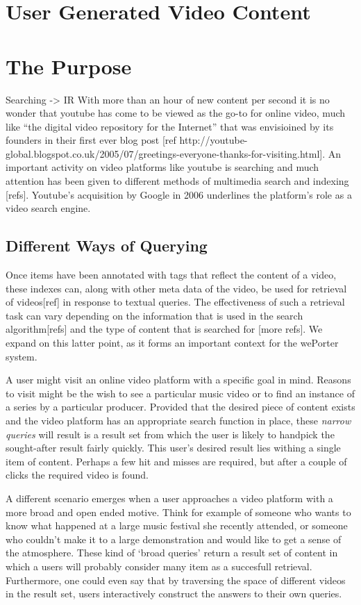 \section{User Generated Video Content}

\section{The Purpose}

Searching -> IR
With more than an hour of new content per second it is no wonder that youtube has come to be viewed as the go-to for online video, much like ``the digital video repository for the Internet'' that was envisioined by its founders in their first ever blog post [ref http://youtube-global.blogspot.co.uk/2005/07/greetings-everyone-thanks-for-visiting.html]. An important activity on video platforms like youtube is searching and much attention has been given to different methods of multimedia search and indexing [refs]. Youtube's acquisition by Google in 2006 underlines the platform's role as a video search engine. 


\subsection{Different Ways of Querying}
Once items have been annotated with tags that reflect the content of a video, these indexes can, along with other meta data of the video, be used for retrieval of videos[ref] in response to textual queries. The effectiveness of such a retrieval task can vary depending on the information that is used in the search algorithm[refs] and the type of content that is searched for \cite{Hollink:2005ei}[more refs]. We expand on this latter point, as it forms an important context for the wePorter system.

A user might visit an online video platform with a specific goal in mind. Reasons to visit might be the wish to see a particular music video or to find an instance of a series by a particular producer. Provided that the desired piece of content exists and the video platform has an appropriate search function in place, these \textit{narrow queries} will result is a result set from which the user is likely to handpick the sought-after result fairly quickly. This user's desired result lies withing a single item of content. Perhaps a few hit and misses are required, but after a couple of clicks the required video is found.

A different scenario emerges when a user approaches a video platform with a more broad and open ended motive. Think for example of someone who wants to know what happened at a large music festival she recently attended, or someone who couldn't make it to a large demonstration and would like to get a sense of the atmosphere. These kind of `broad queries' return a result set of content in which a users will probably consider many item as a succesfull retrieval. Furthermore, one could even say that by traversing the space of different videos in the result set, users interactively construct the answers to their own queries.

